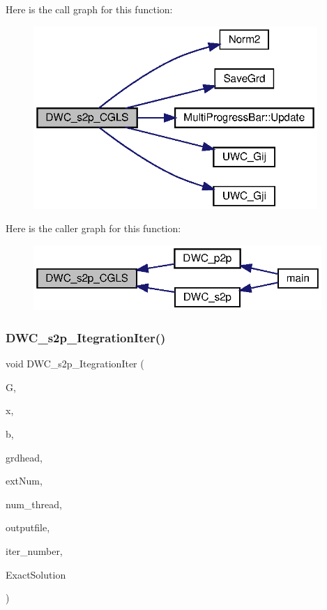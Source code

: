 Here is the call graph for this function\+:
\nopagebreak
\begin{figure}[H]
\begin{center}
\leavevmode
\includegraphics[width=305pt]{Conti2D_8cpp_a6516cfeb71abcf844b32f101e5f77a71_a6516cfeb71abcf844b32f101e5f77a71_cgraph}
\end{center}
\end{figure}
Here is the caller graph for this function\+:\nopagebreak
\begin{figure}[H]
\begin{center}
\leavevmode
\includegraphics[width=310pt]{Conti2D_8cpp_a6516cfeb71abcf844b32f101e5f77a71_a6516cfeb71abcf844b32f101e5f77a71_icgraph}
\end{center}
\end{figure}
\mbox{\label{Conti2D_8cpp_a0a60bfe4f254fa10e96fabb22a125343_a0a60bfe4f254fa10e96fabb22a125343}} 
\subsubsection{D\+W\+C\+\_\+s2p\+\_\+\+Itegration\+Iter()}
{\footnotesize\ttfamily void D\+W\+C\+\_\+s2p\+\_\+\+Itegration\+Iter (\begin{DoxyParamCaption}\item[{double $\ast$$\ast$}]{G,  }\item[{double $\ast$}]{x,  }\item[{double $\ast$}]{b,  }\item[{\textbf{ Grd\+Head}}]{grdhead,  }\item[{int}]{ext\+Num,  }\item[{int}]{num\+\_\+thread,  }\item[{string}]{outputfile,  }\item[{double}]{iter\+\_\+number,  }\item[{double $\ast$}]{Exact\+Solution }\end{DoxyParamCaption})}



